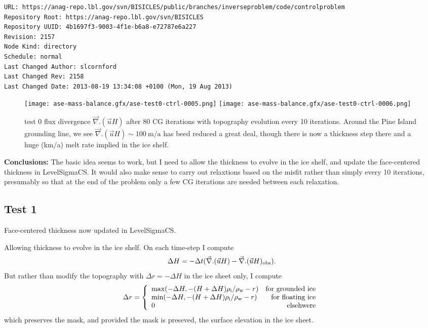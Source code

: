 \documentclass{article}
\begin{document}
\begin{verbatim}
URL: https://anag-repo.lbl.gov/svn/BISICLES/public/branches/inverseproblem/code/controlproblem
Repository Root: https://anag-repo.lbl.gov/svn/BISICLES
Repository UUID: 4b1697f3-9003-4f1e-b6a8-e72787e6a227
Revision: 2157
Node Kind: directory
Schedule: normal
Last Changed Author: slcornford
Last Changed Rev: 2158
Last Changed Date: 2013-08-19 13:34:08 +0100 (Mon, 19 Aug 2013)
\end{verbatim}


\begin{figure}
\begin{center}
\texttt{[image: ase-mass-balance.gfx/ase-test0-ctrl-0005.png]}
\texttt{[image: ase-mass-balance.gfx/ase-test0-ctrl-0006.png]}
\end{center}
\caption{\protect{\label{fig::divuh10}}} test 0 flux divergence $\vec{\nabla}. (\vec{u} H)$
after 80 CG iterations with topography evolution every 10 iterations. 
Around the Pine Island grounding line, we see $\vec{\nabla}. (\vec{u} H) \sim 100~\mbox{m/a}$ has
beed reduced a great deal, though there is now a thickness step there and a huge (km/a) melt rate
implied in the ice shelf.
\end{figure}

{\large {\bf Conclusions:}} The basic idea seems to work, but I need to allow the thickness to evolve in the ice shelf, and
update the face-centered thickness in LevelSigmaCS. It would also make sense to carry out relaxtions based on the misfit rather
than simply every 10 iterations, presumably so that at the end of the problem only a few CG iterations are needed 
between each relaxation.

\newpage

\subsection{Test 1}

Face-centered thickness now updated in LevelSigmaCS.

Allowing thickness to evolve in the ice shelf. On each time-step I compute
\begin{equation}
\Delta H = - \Delta t ( \vec{\nabla}. (\vec{u} H) - \vec{\nabla}. (\vec{u} H) _{\rm obs}).
\end{equation}
But rather than modify the topography with $\Delta r = -\Delta H$ in the ice sheet only, I compute 
\begin{equation}
  \Delta r = \left \{ 
  \begin{array}{lr} 
    {\rm max} (-\Delta H,  -(H + \Delta H)  \rho_{\rm i}/\rho_{\rm w} - r) & \mbox{for grounded ice} \\
    {\rm min} (-\Delta H,  -(H + \Delta H) \rho_{\rm i}/\rho_{\rm w} - r)& \mbox{for floating ice} \\
    0 & \mbox{elsehwere}
  \end{array} \right. 
\end{equation}
which preserves the mask, and provided the mask is preseved, the surface elevation in the ice sheet.
\end{document}
